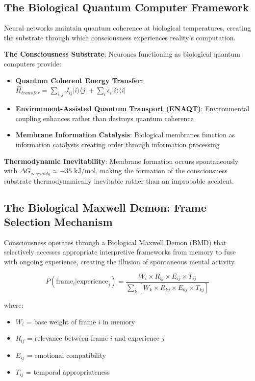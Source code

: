 \documentclass[12pt,a4paper]{article}
\begin{document}
\subsection{The Biological Quantum Computer Framework}

Neural networks maintain quantum coherence at biological temperatures, creating the substrate through which consciousness experiences reality's computation.

\textbf{The Consciousness Substrate}: Neurones functioning as biological quantum computers provide:
\begin{itemize}
\item \textbf{Quantum Coherent Energy Transfer}: $\hat{H}_{transfer} = \sum_{i,j} J_{ij} |i\rangle\langle j| + \sum_i \epsilon_i |i\rangle\langle i|$
\item \textbf{Environment-Assisted Quantum Transport (ENAQT)}: Environmental coupling enhances rather than destroys quantum coherence
\item \textbf{Membrane Information Catalysis}: Biological membranes function as information catalysts creating order through information processing
\end{itemize}

\textbf{Thermodynamic Inevitability}: Membrane formation occurs spontaneously with $\Delta G_{assembly} \approx -35$ kJ/mol, making the formation of the consciousness substrate thermodynamically inevitable rather than an improbable accident.

\subsection{The Biological Maxwell Demon: Frame Selection Mechanism}

Consciousness operates through a Biological Maxwell Demon (BMD) that selectively accesses appropriate interpretive frameworks from memory to fuse with ongoing experience, creating the illusion of spontaneous mental activity.

\begin{equation}
P(\text{frame}_i | \text{experience}_j) = \frac{W_i \times R_{ij} \times E_{ij} \times T_{ij}}{\sum_k[W_k \times R_{kj} \times E_{kj} \times T_{kj}]}
\end{equation}

where:
\begin{itemize}
\item $W_i$ = base weight of frame $i$ in memory
\item $R_{ij}$ = relevance between frame $i$ and experience $j$  
\item $E_{ij}$ = emotional compatibility
\item $T_{ij}$ = temporal appropriateness
\end{itemize}
\end{document}
